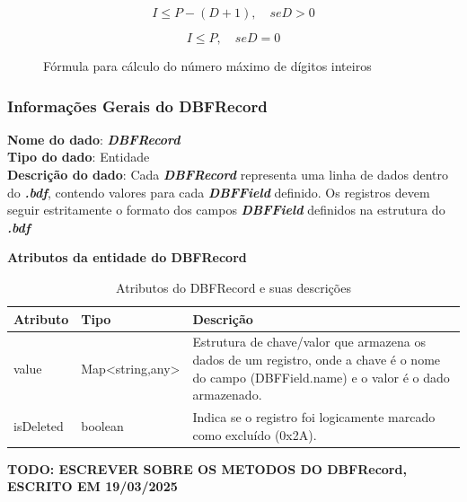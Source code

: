 \begin{figure}[H]
    \begin{equation}
        I \leq P - (D + 1), \quad {se } D > 0
        \end{equation}
        
        \begin{equation}
        I \leq P, \quad {se } D = 0
    \end{equation}
    \caption{Fórmula para cálculo do número máximo de dígitos inteiros}
\end{figure}


\subsubsection{Informações Gerais do DBFRecord}
\textbf{Nome do dado}: \textit{\textbf{DBFRecord}} \\  
\textbf{Tipo do dado}: Entidade \\  
\textbf{Descrição do dado}: Cada \textit{\textbf{DBFRecord}} representa uma linha de dados dentro do \textit{\textbf{.bdf}}, contendo valores para cada \textit{\textbf{DBFField}} definido. Os registros devem seguir estritamente o formato dos campos \textit{\textbf{DBFField}} definidos na estrutura do \textit{\textbf{.bdf}} \\  

\begin{table}[H]
    \centering
    \textbf{Atributos da entidade do DBFRecord}
    \begin{tabular}{|p{} | p{} | p{}|}
        \hline
        \textbf{Atributo} & \textbf{Tipo} & \textbf{Descrição} \\
        \hline
        value & Map<string,any> & Estrutura de chave/valor que armazena os dados de um registro, onde a chave é o nome do campo (DBFField.name) e o valor é o dado armazenado. \\
        \hline
        isDeleted & boolean & Indica se o registro foi logicamente marcado como excluído (0x2A). \\
        \hline
    \end{tabular}
    \caption{Atributos do DBFRecord e suas descrições}
    \label{tab:tabela_atributos_dbfrecord}
\end{table}
\textbf{TODO: ESCREVER SOBRE OS METODOS DO DBFRecord, ESCRITO EM 19/03/2025}
